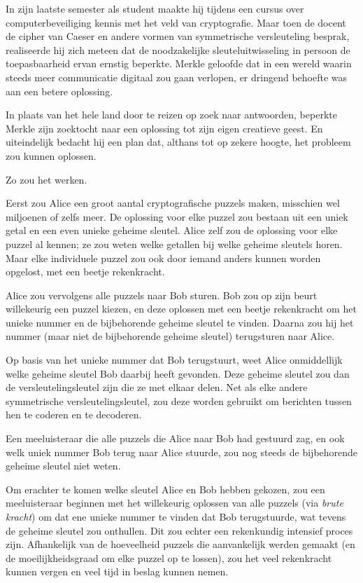 \documentclass[
  a5paper,
  smalldemyvopaper,11pt,twoside,onecolumn,openright,extrafontsizes]{memoir}
\begin{document}
In zijn laatste semester als student maakte hij tijdens een cursus over
computerbeveiliging kennis met het veld van cryptografie. Maar toen de
docent de cipher van Caeser en andere vormen van symmetrische
versleuteling besprak, realiseerde hij zich meteen dat de noodzakelijke
sleuteluitwisseling in persoon de toepasbaarheid ervan ernstig beperkte.
Merkle geloofde dat in een wereld waarin steeds meer communicatie
digitaal zou gaan verlopen, er dringend behoefte was aan een betere
oplossing.

In plaats van het hele land door te reizen op zoek naar antwoorden,
beperkte Merkle zijn zoektocht naar een oplossing tot zijn eigen
creatieve geest. En uiteindelijk bedacht hij een plan dat, althans tot
op zekere hoogte, het probleem zou kunnen oplossen.

Zo zou het werken.

Eerst zou Alice een groot aantal cryptografische puzzels maken,
misschien wel miljoenen of zelfs meer. De oplossing voor elke puzzel zou
bestaan uit een uniek getal en een even unieke geheime sleutel. Alice
zelf zou de oplossing voor elke puzzel al kennen; ze zou weten welke
getallen bij welke geheime sleutels horen. Maar elke individuele puzzel
zou ook door iemand anders kunnen worden opgelost, met een beetje
rekenkracht.

Alice zou vervolgens alle puzzels naar Bob sturen. Bob zou op zijn beurt
willekeurig een puzzel kiezen, en deze oplossen met een beetje
rekenkracht om het unieke nummer en de bijbehorende geheime sleutel te
vinden. Daarna zou hij het nummer (maar niet de bijbehorende geheime
sleutel) terugsturen naar Alice.

Op basis van het unieke nummer dat Bob terugstuurt, weet Alice
onmiddellijk welke geheime sleutel Bob daarbij heeft gevonden. Deze
geheime sleutel zou dan de versleutelingsleutel zijn die ze met elkaar
delen. Net als elke andere symmetrische versleutelingsleutel, zou deze
worden gebruikt om berichten tussen hen te coderen en te decoderen.

Een meeluisteraar die alle puzzels die Alice naar Bob had gestuurd zag,
en ook welk uniek nummer Bob terug naar Alice stuurde, zou nog steeds de
bijbehorende geheime sleutel niet weten.

Om erachter te komen welke sleutel Alice en Bob hebben gekozen, zou een
meeluisteraar beginnen met het willekeurig oplossen van alle puzzels
(via \emph{brute kracht}) om dat ene unieke nummer te vinden dat Bob
terugstuurde, wat tevens de geheime sleutel zou onthullen. Dit zou
echter een rekenkundig intensief proces zijn. Afhankelijk van de
hoeveelheid puzzels die aanvankelijk werden gemaakt (en de
moeilijkheidsgraad om elke puzzel op te lossen), zou het veel
rekenkracht kunnen vergen en veel tijd in beslag kunnen nemen.
\end{document}
